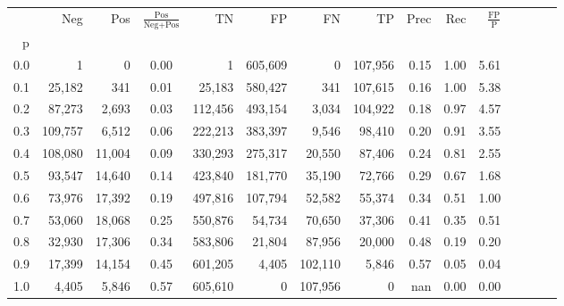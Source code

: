\begin{tabular}{rrrcrrrrrrrrrrr}
\toprule
{} &      Neg &     Pos & $\frac{\text{Pos}}{\text{Neg}+\text{Pos}}$ &       TN &       FP &       FN &       TP &  Prec &   Rec & $\frac{\text{FP}}{\text{P}}$ \\
p   &          &         &                                            &          &          &          &          &       &       &                              \\
\midrule
0.0 &        1 &       0 &                                       0.00 &        1 &  605,609 &        0 &  107,956 &  0.15 &  1.00 &                         5.61 \\
0.1 &   25,182 &     341 &                                       0.01 &   25,183 &  580,427 &      341 &  107,615 &  0.16 &  1.00 &                         5.38 \\
0.2 &   87,273 &   2,693 &                                       0.03 &  112,456 &  493,154 &    3,034 &  104,922 &  0.18 &  0.97 &                         4.57 \\
0.3 &  109,757 &   6,512 &                                       0.06 &  222,213 &  383,397 &    9,546 &   98,410 &  0.20 &  0.91 &                         3.55 \\
0.4 &  108,080 &  11,004 &                                       0.09 &  330,293 &  275,317 &   20,550 &   87,406 &  0.24 &  0.81 &                         2.55 \\
0.5 &   93,547 &  14,640 &                                       0.14 &  423,840 &  181,770 &   35,190 &   72,766 &  0.29 &  0.67 &                         1.68 \\
0.6 &   73,976 &  17,392 &                                       0.19 &  497,816 &  107,794 &   52,582 &   55,374 &  0.34 &  0.51 &                         1.00 \\
0.7 &   53,060 &  18,068 &                                       0.25 &  550,876 &   54,734 &   70,650 &   37,306 &  0.41 &  0.35 &                         0.51 \\
0.8 &   32,930 &  17,306 &                                       0.34 &  583,806 &   21,804 &   87,956 &   20,000 &  0.48 &  0.19 &                         0.20 \\
0.9 &   17,399 &  14,154 &                                       0.45 &  601,205 &    4,405 &  102,110 &    5,846 &  0.57 &  0.05 &                         0.04 \\
1.0 &    4,405 &   5,846 &                                       0.57 &  605,610 &        0 &  107,956 &        0 &   nan &  0.00 &                         0.00 \\
\bottomrule
\end{tabular}

